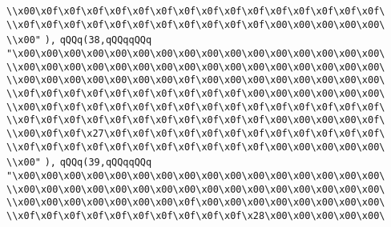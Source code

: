\verb|\\x00\x0f\x0f\x0f\x0f\x0f\x0f\x0f\x0f\x0f\x0f\x0f\x0f\x0f\x0f\x0f\|\newline
\verb|\\x0f\x0f\x0f\x0f\x0f\x0f\x0f\x0f\x0f\x0f\x0f\x00\x00\x00\x00\x00\|\newline
\verb|\\x00"|\newline
\verb|),|\newline
\verb|qQQq(38,qQQqqQQq|\newline
\verb|"\x00\x00\x00\x00\x00\x00\x00\x00\x00\x00\x00\x00\x00\x00\x00\x00\|\newline
\verb|\\x00\x00\x00\x00\x00\x00\x00\x00\x00\x00\x00\x00\x00\x00\x00\x00\|\newline
\verb|\\x00\x00\x00\x00\x00\x00\x00\x0f\x00\x00\x00\x00\x00\x00\x00\x00\|\newline
\verb|\\x0f\x0f\x0f\x0f\x0f\x0f\x0f\x0f\x0f\x0f\x00\x00\x00\x00\x00\x00\|\newline
\verb|\\x00\x0f\x0f\x0f\x0f\x0f\x0f\x0f\x0f\x0f\x0f\x0f\x0f\x0f\x0f\x0f\|\newline
\verb|\\x0f\x0f\x0f\x0f\x0f\x0f\x0f\x0f\x0f\x0f\x0f\x00\x00\x00\x00\x0f\|\newline
\verb|\\x00\x0f\x0f\x27\x0f\x0f\x0f\x0f\x0f\x0f\x0f\x0f\x0f\x0f\x0f\x0f\|\newline
\verb|\\x0f\x0f\x0f\x0f\x0f\x0f\x0f\x0f\x0f\x0f\x0f\x00\x00\x00\x00\x00\|\newline
\verb|\\x00"|\newline
\verb|),|\newline
\verb|qQQq(39,qQQqqQQq|\newline
\verb|"\x00\x00\x00\x00\x00\x00\x00\x00\x00\x00\x00\x00\x00\x00\x00\x00\|\newline
\verb|\\x00\x00\x00\x00\x00\x00\x00\x00\x00\x00\x00\x00\x00\x00\x00\x00\|\newline
\verb|\\x00\x00\x00\x00\x00\x00\x00\x0f\x00\x00\x00\x00\x00\x00\x00\x00\|\newline
\verb|\\x0f\x0f\x0f\x0f\x0f\x0f\x0f\x0f\x0f\x0f\x28\x00\x00\x00\x00\x00\|\newline

